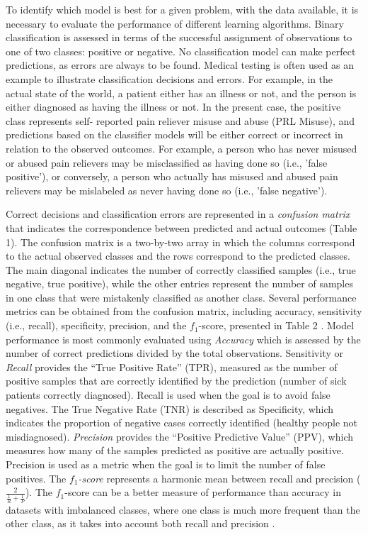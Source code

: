 \documentclass[sigconf]{acmart}
\begin{document}
To identify which model is best for a given problem, with the data available, 
it is necessary to evaluate the performance of different learning algorithms. 
Binary classification is assessed in terms of the successful assignment of 
observations to one of two classes: positive or negative. No classification 
model can make perfect predictions, as errors are always to be found. Medical 
testing is often used as an example to illustrate classification decisions 
and errors. For example, in the actual state of the world, a patient either 
has an illness or not, and the person is either diagnosed as having the 
illness or not. In the present case, the positive class represents self-
reported pain reliever misuse and abuse (PRL Misuse), and predictions based on 
the classifier models will be either correct or incorrect in relation to the 
observed outcomes. For example, a person who has never misused or abused pain 
relievers may be misclassified as having done so (i.e., 'false positive'), or 
conversely, a person who actually has misused and abused pain relievers may 
be mislabeled as never having done so (i.e., 'false negative').


Correct decisions and classification errors are represented in a 
\emph{confusion matrix} that indicates the correspondence between predicted 
and actual outcomes (Table 1). The confusion matrix is a two-by-two array in 
which the columns correspond to the actual observed classes and the rows 
correspond to the predicted classes. The main diagonal indicates the number 
of correctly classified samples (i.e., true negative, true positive), while 
the other entries represent the number of samples in one class that were 
mistakenly classified as another class. Several performance metrics can be 
obtained from the confusion matrix, including accuracy, sensitivity (i.e., 
recall), specificity, precision, and the $f_1$-score, presented in Table 2 
\cite{kuhn13, wiki18}. Model performance is most commonly evaluated using 
\emph{Accuracy} which is assessed by the number of correct predictions 
divided by the total observations. Sensitivity or \emph{Recall} provides the 
``True Positive Rate'' (TPR), measured as the number of positive samples that 
are correctly identified by the prediction (number of sick patients correctly
diagnosed). Recall is used when the goal is to avoid false negatives. The 
True Negative Rate (TNR) is described as Specificity, which indicates the 
proportion of negative cases correctly identified (healthy people not 
misdiagnosed). \emph{Precision} provides the ``Positive Predictive Value'' 
(PPV), which measures how many of the samples predicted as positive are 
actually positive. Precision is used as a metric when the goal is to limit
the number of false positives. The \emph{$f_1$-score} represents a harmonic 
mean between recall and precision (\(\frac{2}{ \frac{1}{R} + \frac{1}{P} }\)). 
The $f_1$-score can be a better measure of performance than accuracy in 
datasets with imbalanced classes, where one class is much more frequent 
than the other class, as it takes into account both recall and precision 
\cite{muller17, yun09}.
\end{document}
